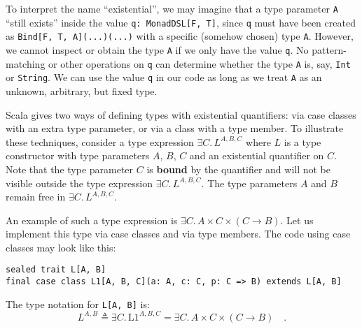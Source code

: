 To interpret the name \textsf{``}existential\textsf{''}, we may imagine that a type
parameter \lstinline!A!
\textsf{``}still exists\textsf{''} inside the value \lstinline!q: MonadDSL[F, T]!,
since \lstinline!q! must
have been created as \lstinline!Bind[F, T, A](...)(...)!
with a specific (somehow chosen) type \lstinline!A!.
However, we cannot inspect or obtain the type \lstinline!A!
if we only have the value \lstinline!q!.
No pattern-matching or other operations on \lstinline!q!
can determine whether the type \lstinline!A!
is, say, \lstinline!Int!
or \lstinline!String!.
We can use the value \lstinline!q!
in our code as long as we treat \lstinline!A!
as an unknown, arbitrary, but fixed type.

Scala gives two ways of defining types with existential quantifiers:
via case classes with an extra type parameter, or via a class with
a type member. To illustrate these techniques, consider a type expression
$\exists C.\,L^{A,B,C}$ where $L$ is a type constructor with type
parameters $A$, $B$, $C$ and an existential quantifier on $C$.
Note that the type parameter $C$ is
\textbf{bound} by the quantifier and will not be visible outside the
type expression $\exists C.\,L^{A,B,C}$. The type parameters $A$
and $B$ remain free in $\exists C.\,L^{A,B,C}$.

An example of such a type expression is $\exists C.\,A\times C\times\left(C\rightarrow B\right)$.
Let us implement this type via case classes and via type members.
The code using case classes may look like this:
\begin{lstlisting}
sealed trait L[A, B]
final case class L1[A, B, C](a: A, c: C, p: C => B) extends L[A, B]
\end{lstlisting}
The type notation for \lstinline!L[A, B]!
is:
\[
L^{A,B}\triangleq\exists C.\,\text{L1}^{A,B,C}=\exists C.\,A\times C\times(C\rightarrow B)\quad.
\]

